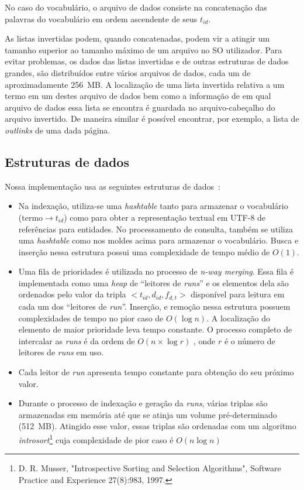 \documentclass[10pt,twocolumn]{article}
\begin{document}
No caso do vocabulário, o arquivo de dados consiste na concatenação das
palavras do vocabulário em ordem ascendente de seus \(t_{id}\).

As listas invertidas podem, quando concatenadas, podem vir a atingir um tamanho
superior ao tamanho máximo de um arquivo no SO utilizador. Para evitar
problemas, os dados das listas invertidas e de outras estruturas de
dados grandes, são distribuídos entre vários
arquivos de dados, cada um de aproximadamente 256~MB. A localização de
uma lista invertida relativa a um termo em um destes arquivo de dados
bem como a informação de em qual arquivo de dados essa lista se encontra
é guardada no arquivo-cabeçalho do arquivo invertido. De maneira similar
é possível encontrar, por exemplo, a lista de \emph{outlinks} de uma
dada página.

\subsection{Estruturas de dados}\label{sec:datastructures}

Nossa implementação usa as seguintes estruturas de
dados~\cite{cormen-algorithms}:

\begin{itemize}

\item Na indexação, utiliza-se uma \emph{hashtable} tanto para armazenar
o vocabulário (termo\(\rightarrow t_{id}\)) como para obter a representação
textual em UTF-8 de referências para entidades. No processamento de
consulta, também se utiliza uma \emph{hashtable} como nos moldes acima
para armazenar o vocabulário.  Busca e inserção nessa estrutura possui
uma complexidade de tempo médio de \(O\left(1 \right)\).

\item Uma fila de prioridades é utilizada no processo de \emph{n-way
merging}. Essa fila é implementada como uma \emph{heap} de ``leitores de
\emph{runs}'' e os elementos dela são ordenados pelo valor da tripla
\(<t_{id}, d_{id}, f_{d,t}>\) disponível para leitura em cada um dos
``leitores de \emph{run}''.  Inserção, e remoção nessa estrutura possuem
complexidades de tempo no pior caso de \(O\left(\log n\right)\). A
localização do elemento de maior prioridade leva tempo constante.  O
processo completo de intercalar as \emph{runs} é da ordem de \(O\left(
n\times\log r\right)\) , onde \(r\) é o número de leitores de
\emph{runs} em uso.

\item Cada leitor de \emph{run} apresenta tempo constante para obtenção
do seu próximo valor.

\item Durante o processo de indexação e geração da \emph{runs}, várias
triplas são armazenadas em memória até que se atinja um volume
pré-determinado (512~MB). Atingido esse valor, essas triplas são
ordenadas com um algoritmo \emph{introsort}\footnote{ D. R. Musser,
"Introspective Sorting and Selection Algorithms", Software Practice and
Experience 27(8):983, 1997.  } cuja complexidade de pior caso é
\(O\left(n \log n\right)\)

\end{itemize}
\end{document}

